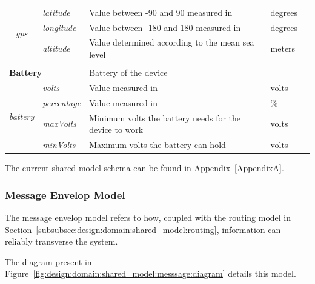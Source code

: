 \begin{landscape}
\begin{longtable}{cllll}
   \multirow{3}{*}{\textit{gps}}         & \textit{latitude}                  & Value between -90 and 90 measured in                   & degrees                        &  \\
                                         & \textit{longitude}                 & Value between -180 and 180 measured in                 & degrees                        &  \\
                                         & \textit{altitude}                  & Value determined according to the mean sea level       & meters                         &  \\ [0.4em] \cline{1-4}
   \\[-0.85em]
   \multicolumn{2}{l}{\textbf{Battery}}                                       & \multicolumn{2}{l}{Battery of the device}                                               &  \\
   \multirow{4}{*}{\textit{battery}}     & \textit{volts}                     & Value measured in                                      & volts                          &  \\
                                         & \textit{percentage}                & Value measured in                                      & \%                             &  \\
                                         & \textit{maxVolts}                  & Minimum volts the battery needs for the device to work & volts                          &  \\
                                         & \textit{minVolts}                  & Maximum volts the battery can hold                     & volts                          &  \\ [0.4em] \cline{1-4}
   \end{longtable}
\end{landscape}

The current shared model schema can be found in Appendix~\ref{AppendixA}.

\subsubsection{Message Envelop Model}
\label{subsubsec:design:domain:shared_model:message}

The message envelop model refers to how, coupled with the routing model in Section~\ref{subsubsec:design:domain:shared_model:routing}, information can reliably transverse the system.

The diagram present in Figure~\ref{fig:design:domain:shared_model:messsage:diagram} details this model.

